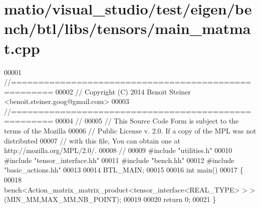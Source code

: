 \hypertarget{matio_2visual__studio_2test_2eigen_2bench_2btl_2libs_2tensors_2main__matmat_8cpp_source}{}\section{matio/visual\+\_\+studio/test/eigen/bench/btl/libs/tensors/main\+\_\+matmat.cpp}
\label{matio_2visual__studio_2test_2eigen_2bench_2btl_2libs_2tensors_2main__matmat_8cpp_source}

\begin{DoxyCode}
00001 \textcolor{comment}{//=====================================================}
00002 \textcolor{comment}{// Copyright (C) 2014 Benoit Steiner <benoit.steiner.goog@gmail.com>}
00003 \textcolor{comment}{//=====================================================}
00004 \textcolor{comment}{//}
00005 \textcolor{comment}{// This Source Code Form is subject to the terms of the Mozilla}
00006 \textcolor{comment}{// Public License v. 2.0. If a copy of the MPL was not distributed}
00007 \textcolor{comment}{// with this file, You can obtain one at http://mozilla.org/MPL/2.0/.}
00008 \textcolor{comment}{//}
00009 \textcolor{preprocessor}{#include "utilities.h"}
00010 \textcolor{preprocessor}{#include "tensor\_interface.hh"}
00011 \textcolor{preprocessor}{#include "bench.hh"}
00012 \textcolor{preprocessor}{#include "basic\_actions.hh"}
00013 
00014 BTL\_MAIN;
00015 
00016 \textcolor{keywordtype}{int} main()
00017 \{
00018   bench<Action\_matrix\_matrix\_product<tensor\_interface<REAL\_TYPE> > >(MIN\_MM,MAX\_MM,NB\_POINT);
00019 
00020   \textcolor{keywordflow}{return} 0;
00021 \}
\end{DoxyCode}
